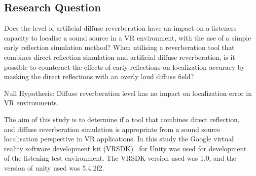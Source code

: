 \documentclass[paper=a4, fontsize=10pt, font=arial]{scrartcl} %
\numberwithin{equation}{section} %
\numberwithin{figure}{section} %
\numberwithin{table}{section} %
\begin{document}
\subsection{Research Question}

Does the level of artificial diffuse reverberation have an impact on a listeners capacity to localise a sound source in a VR environment, with the use of a simple early reflection simulation method? When utilising a reverberation tool that combines direct reflection simulation and artificial diffuse reverberation, is it possible to counteract the effects of early reflections on localization accuracy by masking the direct reflections with an overly loud diffuse field?

Null Hypothesis: Diffuse reverberation level has no impact on localization error in VR environments.

The aim of this study is to determine if a tool that combines direct reflection, and diffuse reverberation simulation is appropriate from a sound source localisation perspective in VR applications. In this study the Google virtual reality software development kit (VRSDK)~\cite{googlevr2016} for Unity was used for development of the listening test environment. The VRSDK version used was 1.0, and the version of unity used was 5.4.2f2.

  

\end{document}
